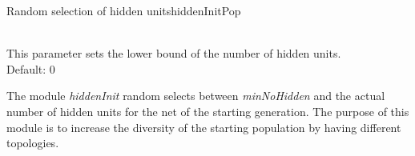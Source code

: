 \begin{moduledoc}{Random selection of hidden units}{hiddenInitPop}
  \item[\KeyWord{minNoHidden} \optParam{ x } ]~\\
    This parameter sets the lower bound of the number of hidden units.\\
    
    Default: 0 
\end{moduledoc}

The module {\it hiddenInit} random selects between {\it minNoHidden} and
the actual number of hidden units for the net of the starting generation.
The purpose of this module is to increase the diversity of the starting population
by having different topologies.
